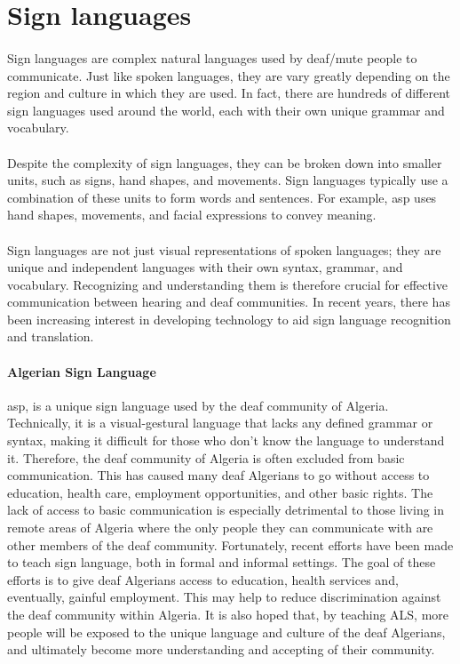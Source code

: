 \section{Sign languages}
\paragraph{}
Sign languages are complex natural languages used by deaf/mute people to communicate. Just like spoken languages, they are vary greatly depending on the region and culture in which they are used. In fact, there are hundreds of different sign languages used around the world, each with their own unique grammar and vocabulary.
\paragraph{}
Despite the complexity of sign languages, they can be broken down into smaller units, such as signs, hand shapes, and movements. Sign languages typically use a combination of these units to form words and sentences. For example, \ac{asp} uses hand shapes, movements, and facial expressions to convey meaning.
\paragraph{}
Sign languages are not just visual representations of spoken languages; they are unique and independent languages with their own syntax, grammar, and vocabulary. Recognizing and understanding them is therefore crucial for effective communication between hearing and deaf communities. In recent years, there has been increasing interest in developing technology to aid sign language recognition and translation.
\paragraph{Algerian Sign Language}
\ac{asp}, is a unique sign language used by the deaf community of Algeria. Technically, it is a visual-gestural language that lacks any defined grammar or syntax, making it difficult for those who don’t know the language to understand it. Therefore, the deaf community of Algeria is often excluded from basic communication. This has caused many deaf Algerians to go without access to education, health care, employment opportunities, and other basic rights. The lack of access to basic communication is especially detrimental to those living in remote areas of Algeria where the only people they can communicate with are other members of the deaf community. Fortunately, recent efforts have been made to teach sign language, both in formal and informal settings. The goal of these efforts is to give deaf Algerians access to education, health services and, eventually, gainful employment. This may help to reduce discrimination against the deaf community within Algeria. It is also hoped that, by teaching ALS, more people will be exposed to the unique language and culture of the deaf Algerians, and ultimately become more understanding and accepting of their community.